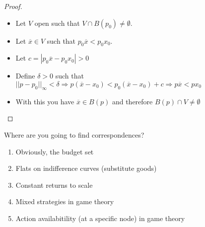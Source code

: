 \documentclass[aspectratio=169]{beamer}
\begin{document}
\begin{frame}
    \begin{proof}
        \begin{itemize}
            \item Let $V$ open such that $V\cap B(p_0)\neq \emptyset$.
            \item Let $\overline{x}\in V$ such that $p_0 \overline{x}<p_0x_0$.
            \item Let $c=|p_0\overline{x}-p_0x_0|>0$
            \item Define $\delta>0$ such that $||p-p_0||_{\infty}<\delta\Rightarrow p(\overline{x}-x_0)<p_0(\overline{x}-x_0)+c\Rightarrow p\overline{x}<px_0$
            \item With this you have $\overline{x}\in B(p)$ and therefore $B(p)\cap V\neq \emptyset$
        \end{itemize}
    \end{proof}
   
\end{frame}

\begin{frame}
    Where are you going to find correspondences?
    \begin{enumerate}
        \item Obviously, the budget set
        \item Flats on indifference curves (substitute goods)
        \item Constant returns to scale
        \item Mixed strategies in game theory
        \item Action availabitility (at a specific node) in game theory
    \end{enumerate}
\end{frame}
\end{document}
